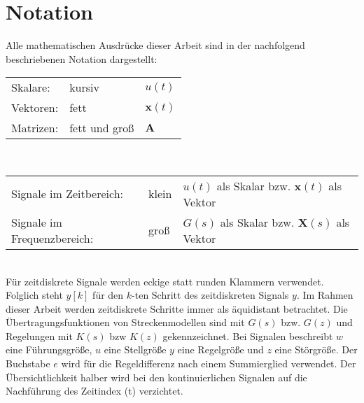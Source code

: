 \newpage
\thispagestyle{plain}

\chapter*{Notation}

Alle mathematischen Ausdrücke dieser Arbeit sind in der nachfolgend beschriebenen Notation dargestellt:\\
\begin{table}[ht]
	\begin{tabular}{lll}
		Skalare:    & kursiv & $u(t)$ \\
		Vektoren: & fett & $\mathbf{x}(t)$ \\
		Matrizen:  & fett und groß & $\mathbf{A}$ \\
	\end{tabular}
	\vspace{3mm}\\
	\begin{tabular}{lll}
		Signale im Zeitbereich: & klein & $u(t)$ als Skalar bzw. $\mathbf{x}(t)$ als Vektor\\
		Signale im Frequenzbereich: & groß & $G(s)$ als Skalar bzw. $\mathbf{X}(s)$ als Vektor\\
	\end{tabular}
\end{table}
\\
Für zeitdiskrete Signale werden eckige statt runden Klammern verwendet. Folglich steht $y[k]$ für den $k$-ten Schritt des zeitdiskreten Signals $y$. Im Rahmen dieser Arbeit werden zeitdiskrete Schritte immer als äquidistant betrachtet.
Die Übertragungsfunktionen von Streckenmodellen sind mit $G(s)$ bzw. $G(z)$ und Regelungen mit $K(s)$ bzw $K(z)$ gekennzeichnet. Bei Signalen beschreibt $w$ eine Führungsgröße, $u$ eine Stellgröße $y$ eine Regelgröße und $z$ eine Störgröße. Der Buchstabe $e$ wird für die Regeldifferenz nach einem Summierglied verwendet. Der Übersichtlichkeit halber wird bei den kontinuierlichen Signalen auf die Nachführung des Zeitindex (t) verzichtet.